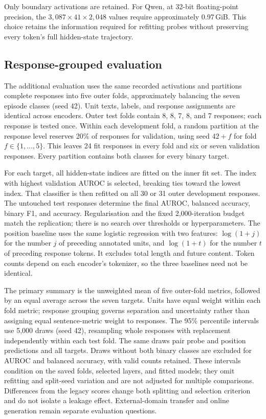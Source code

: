 \documentclass[12pt,a4paper,twoside,openright]{book}
\begin{document}
Only boundary activations are retained. For Qwen, at 32-bit floating-point
precision, the $3{,}087\times41\times2{,}048$ values require approximately 0.97\,GiB.
This choice retains the
information required for refitting probes without preserving every token's
full hidden-state trajectory.


\subsection{Response-grouped evaluation}
\label{sec:setup-grouped-probes}

The additional evaluation uses the same recorded activations and partitions
complete responses into five outer folds, approximately balancing the seven
episode classes (seed 42). Unit texts, labels, and response assignments are
identical across encoders. Outer test folds contain 8, 8, 7, 8, and 7 responses; each response is tested once.
Within each development fold, a random partition at the response level
reserves 20\% of responses for validation, using seed $42+f$ for fold
$f\in\{1,\ldots,5\}$. This leaves 24 fit responses in every fold and
six or seven validation responses. Every partition contains both classes for every binary target.

For each target, all hidden-state indices are fitted on the inner fit set.
The index with highest validation AUROC is selected, breaking ties toward
the lowest index. That classifier is then refitted on all 30 or 31 outer
development responses. The untouched test responses determine the final
AUROC, balanced accuracy, binary F1, and accuracy. Regularisation and the
fixed 2,000-iteration budget match the replication; there is no search over
thresholds or hyperparameters. The position baseline uses the same logistic
regression with two features: $\log(1+j)$ for the number $j$ of preceding
annotated units, and $\log(1+t)$ for the number $t$ of preceding response
tokens. It excludes total length and future content. Token counts depend
on each encoder's tokenizer, so the three baselines need not be identical.

The primary summary is the unweighted mean of five outer-fold metrics,
followed by an equal average across the seven targets. Units have equal
weight within each fold metric; response grouping governs separation and
uncertainty rather than assigning equal sentence-metric weight to responses.
The 95\% percentile intervals use 5,000 draws (seed 42), resampling whole
responses with replacement independently within each test fold. The same
draws pair probe and position predictions and all targets. Draws without
both binary classes are excluded for AUROC and balanced accuracy, with
valid counts retained. These intervals condition on the saved folds, selected
layers, and fitted models; they omit refitting and split-seed variation and
are not adjusted for multiple comparisons. Differences from the legacy
scores change both splitting and selection criterion and do not isolate a
leakage effect. External-domain transfer and online generation remain
separate evaluation questions.
\end{document}
